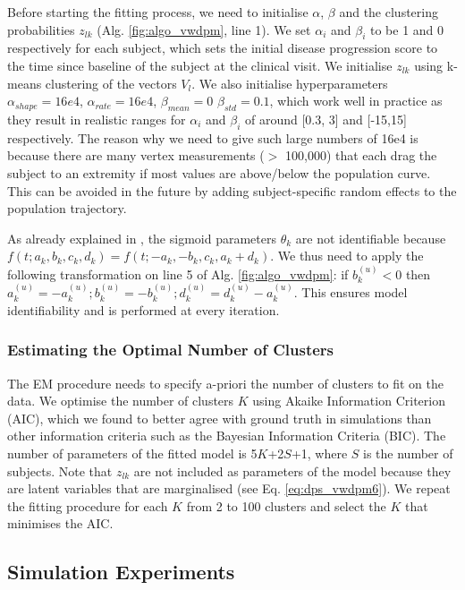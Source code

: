 Before starting the fitting process, we need to initialise $\alpha$, $\beta$ and the clustering probabilities $z_{lk}$ (Alg. \ref{fig:algo_vwdpm}, line 1). We set $\alpha_i$ and $\beta_i$ to be 1 and 0 respectively for each subject, which sets the initial disease progression score to the time since baseline of the subject at the clinical visit. We initialise $z_{lk}$ using k-means clustering of the vectors $V_l$. We also initialise hyperparameters $\alpha_{shape}=16e4$, $\alpha_{rate}=16e4$, $\beta_{mean} = 0$ $\beta_{std} = 0.1$, which work well in practice as they result in realistic ranges for $\alpha_i$ and $\beta_i$ of around [0.3, 3] and [-15,15] respectively. The reason why we need to give such large numbers of 16e4 is because there are many vertex measurements ($>$ 100,000) that each drag the subject to an extremity if most values are above/below the population curve. This can be avoided in the future by adding subject-specific random effects to the population trajectory.

As already explained in \cite{jedynak2012computational}, the sigmoid parameters $\theta_k$ are not identifiable because $f(t;a_k,b_k, c_k, d_k) = f(t;-a_k,-b_k, c_k, a_k + d_k)$. We thus need to apply the following transformation on line 5 of Alg. \ref{fig:algo_vwdpm}: if $b_k^{(u)} < 0$ then $a_k^{(u)} = - a_k^{(u)}; b_k^{(u)} = - b_k^{(u)}; d_k^{(u)} = d_k^{(u)} - a_k^{(u)}$. This ensures model identifiability and is performed at every iteration. 

\subsubsection{Estimating the Optimal Number of Clusters}

The EM procedure needs to specify a-priori the number of clusters to fit on the data. We optimise the number of clusters $K$ using Akaike Information Criterion (AIC), which we found to better agree with ground truth in simulations than other information criteria such as the Bayesian Information Criteria (BIC). The number of parameters of the fitted model is 5$K$+2$S$+1, where $S$ is the number of subjects. Note that $z_{lk}$ are not included as parameters of the model because they are latent variables that are marginalised (see Eq. \ref{eq:dps_vwdpm6}). We repeat the fitting procedure for each $K$ from 2 to 100 clusters and select the $K$ that minimises the AIC.


\subsection{Simulation Experiments}
\label{sec:diveSimulations}

